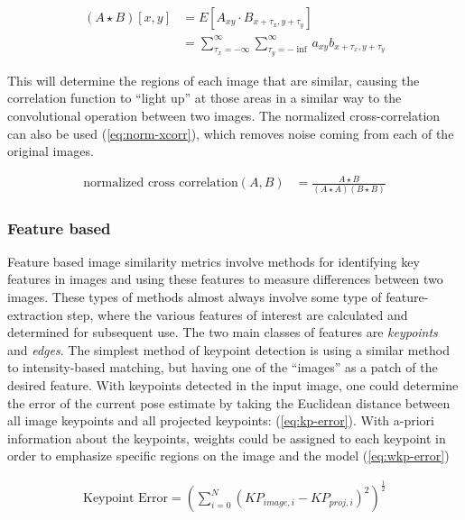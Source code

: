 \begin{equation}
    \begin{aligned}
        (A \star B)[x,y] &= E[A_{xy} \cdot B_{x + \tau_x,y+\tau_y}] \\
        &= \sum_{\tau_x=-\infty}^{\infty}\sum_{\tau_y=-\inf}^{\infty}a_{xy}b_{x + \tau_x,y + \tau_y}
    \end{aligned}
    \label{eq:xcorr}
\end{equation}

This will determine the regions of each image that are similar, causing the correlation function to ``light up'' at those areas in a similar way to the convolutional operation between two images.
The normalized cross-correlation can also be used (\cref{eq:norm-xcorr}), which removes noise coming from each of the original images.

\begin{equation}
    \begin{aligned}
        \text{normalized cross correlation}(A,B) &= \frac{A \star B}{(A \star A)(B \star B)}
    \end{aligned}\label{eq:norm-xcorr}
\end{equation}

\subsubsection{Feature based}
\label{sec:img-sim-feature}
Feature based image similarity metrics involve methods for identifying key features in images and using these features to measure differences between two images.
These types of methods almost always involve some type of feature-extraction step, where the various features of interest are calculated and determined for subsequent use.
The two main classes of features are \emph{keypoints} and \emph{edges}.
The simplest method of keypoint detection is using a similar method to intensity-based matching, but having one of the ``images'' as a patch of the desired feature.
With keypoints detected in the input image, one could determine the error of the current pose estimate by taking the Euclidean distance between all image keypoints and all projected keypoints: \cite{burtonAutomaticTrackingHealthy2021} (\cref{eq:kp-error}).
With a-priori information about the keypoints, weights could be assigned to each keypoint in order to emphasize specific regions on the image and the model (\cref{eq:wkp-error})

\begin{equation}
    \begin{aligned}
        \text{Keypoint Error}= (\sum_{i = 0}^{N}(KP_{image,i} - KP_{proj,i})^2)^{\frac{1}{2}}
    \end{aligned}
    \label{eq:kp-error}
\end{equation}

